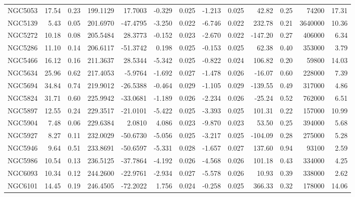 \begin{longtable}{ | l | r | r| r | r | r | r | r | r | r | r | r | r  |}
            NGC5053       &  17.54 & 0.23 & 199.1129 &  17.7003 &  -0.329 & 0.025 &  -1.213 &  0.025 &   42.82 &  0.25 &   74200 & 17.31\\ 
            NGC5139       &   5.43 & 0.05 & 201.6970 & -47.4795 &  -3.250 & 0.022 &  -6.746 &  0.022 &  232.78 &  0.21 & 3640000 & 10.36\\ 
            NGC5272       &  10.18 & 0.08 & 205.5484 &  28.3773 &  -0.152 & 0.023 &  -2.670 &  0.022 & -147.20 &  0.27 &  406000 &  6.34\\ 
            NGC5286       &  11.10 & 0.14 & 206.6117 & -51.3742 &   0.198 & 0.025 &  -0.153 &  0.025 &   62.38 &  0.40 &  353000 &  3.79\\ 
            NGC5466       &  16.12 & 0.16 & 211.3637 &  28.5344 &  -5.342 & 0.025 &  -0.822 &  0.024 &  106.82 &  0.20 &   59800 & 14.03\\ 
            NGC5634       &  25.96 & 0.62 & 217.4053 &  -5.9764 &  -1.692 & 0.027 &  -1.478 &  0.026 &  -16.07 &  0.60 &  228000 &  7.39\\ 
            NGC5694       &  34.84 & 0.74 & 219.9012 & -26.5388 &  -0.464 & 0.029 &  -1.105 &  0.029 & -139.55 &  0.49 &  317000 &  4.86\\ 
            NGC5824       &  31.71 & 0.60 & 225.9942 & -33.0681 &  -1.189 & 0.026 &  -2.234 &  0.026 &  -25.24 &  0.52 &  762000 &  6.51\\ 
            NGC5897       &  12.55 & 0.24 & 229.3517 & -21.0101 &  -5.422 & 0.025 &  -3.393 &  0.025 &  101.31 &  0.22 &  157000 & 10.99\\ 
            NGC5904       &   7.48 & 0.06 & 229.6384 &   2.0810 &   4.086 & 0.023 &  -9.870 &  0.023 &   53.50 &  0.25 &  394000 &  5.68\\ 
            NGC5927       &   8.27 & 0.11 & 232.0029 & -50.6730 &  -5.056 & 0.025 &  -3.217 &  0.025 & -104.09 &  0.28 &  275000 &  5.28\\ 
            NGC5946       &   9.64 & 0.51 & 233.8691 & -50.6597 &  -5.331 & 0.028 &  -1.657 &  0.027 &  137.60 &  0.94 &   93100 &  2.59\\ 
            NGC5986       &  10.54 & 0.13 & 236.5125 & -37.7864 &  -4.192 & 0.026 &  -4.568 &  0.026 &  101.18 &  0.43 &  334000 &  4.25\\ 
            NGC6093       &  10.34 & 0.12 & 244.2600 & -22.9761 &  -2.934 & 0.027 &  -5.578 &  0.026 &   10.93 &  0.39 &  338000 &  2.62\\ 
            NGC6101       &  14.45 & 0.19 & 246.4505 & -72.2022 &   1.756 & 0.024 &  -0.258 &  0.025 &  366.33 &  0.32 &  178000 & 14.06\\ 

\end{longtable}
